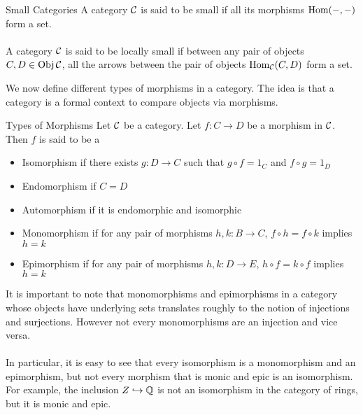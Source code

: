 \documentclass[a4paper]{article}
\begin{document}
\begin{defn}{Small Categories}{} A category $\mathcal{C}$ is said to be small if all its morphisms $\operatorname{Hom}(-,-)$ form a set. \\~\\
A category $\mathcal{C}$ is said to be locally small if between any pair of objects $C,D\in\operatorname{Obj}\mathcal{C}$, all the arrows between the pair of objects $\operatorname{Hom}_{\mathcal{C}}(C,D)$ form a set. 
\end{defn}

We now define different types of morphisms in a category. The idea is that a category is a formal context to compare objects via morphisms. 

\begin{defn}{Types of Morphisms}{} Let $\mathcal{C}$ be a category. Let $f:C\to D$ be a morphism in $\mathcal{C}$. Then $f$ is said to be a
\begin{itemize}
\item Isomorphism if there exists $g:D\to C$ such that $g\circ f=1_C$ and $f\circ g=1_D$
\item Endomorphism if $C=D$
\item Automorphism if it is endomorphic and isomorphic
\item Monomorphism if for any pair of morphisms $h,k:B\to C$, $f\circ h=f\circ k$ implies $h=k$
\item Epimorphism if for any pair of morphisms $h,k:D\to E$, $h\circ f=k\circ f$ implies $h=k$
\end{itemize}
\end{defn}

It is important to note that monomorphisms and epimorphisms in a category whose objects have underlying sets translates roughly to the notion of injections and surjections. However not every monomorphisms are an injection and vice versa. \\~\\

In particular, it is easy to see that every isomorphism is a monomorphism and an epimorphism, but not every morphism that is monic and epic is an isomorphism. For example, the inclusion $Z\hookrightarrow\mathbb{Q}$ is not an isomorphism in the category of rings, but it is monic and epic. 
\end{document}
